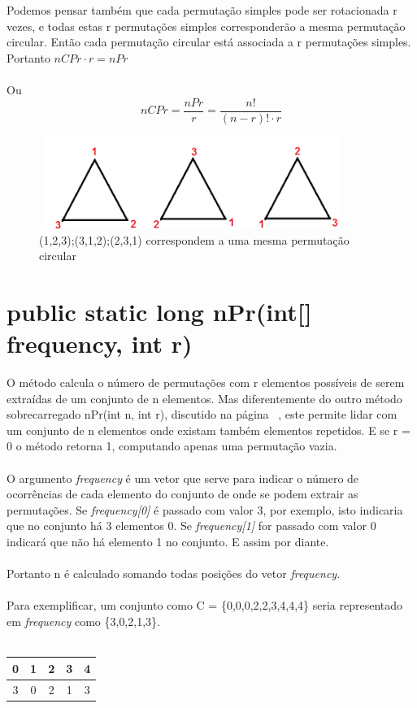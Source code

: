 \documentclass[a4paper,12pt,openany]{book}
\begin{document}
Podemos pensar também que cada permutação simples pode ser rotacionada r vezes, e todas estas r permutações simples corresponderão a mesma permutação circular. Então cada permutação circular está associada a r permutações simples. Portanto $ nCPr \cdot r = nPr $ 
\\
\\
Ou
$$
nCPr = \frac{nPr}{r} = \frac{n!}{(n-r)! \cdot r}
$$

\begin{figure}[!h]
	\centering
	\includegraphics[height=3cm,width=10cm]{figuras/figura1.png}
	\caption{(1,2,3);(3,1,2);(2,3,1) correspondem a uma mesma permutação circular}
\end{figure}

\section*{public static long nPr(int[] frequency, int r)}

O método calcula o número de permutações com r elementos possíveis de serem extraídas de um conjunto de n elementos. Mas diferentemente do outro método sobrecarregado nPr(int n, int r), discutido na página ~\pageref{metodo:nPr01}, este permite lidar com um conjunto de n elementos onde existam também elementos repetidos. E se r = 0 o método retorna 1, computando apenas uma permutação vazia.
\\
\\
O argumento \textit{frequency} é um vetor que serve para indicar o número de ocorrências de cada elemento do conjunto de onde se podem extrair as permutações. Se \textit{frequency[0]} é passado com valor 3, por exemplo, isto indicaria que no conjunto há 3 elementos 0. Se \textit{frequency[1]} for passado com valor 0 indicará que não há elemento 1 no conjunto. E assim por diante.
\\
\\
Portanto n é calculado somando todas posições do vetor \textit{frequency}.
\\
\\
Para exemplificar, um conjunto como C = \{0,0,0,2,2,3,4,4,4\} seria representado em \textit{frequency} como \{3,0,2,1,3\}.
\\
\\
\begin{tabular}{|c|c|c|c|c|}
	\hline
	0 & 1 & 2 & 3 & 4 \\
	\hline
	3 & 0 & 2 & 1 & 3 \\
	\hline
\end{tabular}
\end{document}
